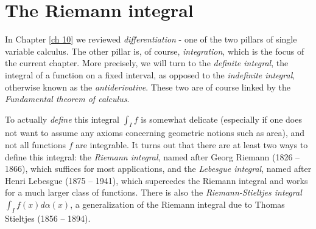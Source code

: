 \chapter{The Riemann integral}\label{ch 11}

\begin{note}
    In Chapter \ref{ch 10} we reviewed \emph{differentiation} - one of the two pillars of single variable calculus.
    The other pillar is, of course, \emph{integration}, which is the focus of the current chapter.
    More precisely, we will turn to the \emph{definite integral}, the integral of a function on a fixed interval, as opposed to the \emph{indefinite integral}, otherwise known as the \emph{antiderivative}.
    These two are of course linked by the \emph{Fundamental theorem of calculus}.
\end{note}

\begin{note}
    To actually \emph{define} this integral \(\int_I f\) is somewhat delicate (especially if one does not want to assume any axioms concerning geometric notions such as area), and not all functions \(f\) are integrable.
    It turns out that there are at least two ways to define this integral:
    the \emph{Riemann integral}, named after Georg Riemann (1826 -- 1866), which suffices for most applications, and the \emph{Lebesgue integral}, named after Henri Lebesgue (1875 -- 1941), which supercedes the Riemann integral and works for a much larger class of functions.
    There is also the \emph{Riemann-Stieltjes integral} \(\int_I f(x) d \alpha(x)\), a generalization of the Riemann integral due to Thomas Stieltjes (1856 -- 1894).
\end{note}










